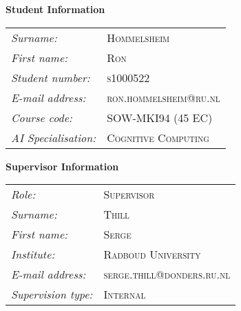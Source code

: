     
    \vspace{3cm}
    \textbf{Student Information} \\

    \begin{tabular}{L{3cm}l}
                \emph{Surname:} & \textsc{Hommelsheim} \\
                \emph{First name:} & \textsc{Ron} \\
                \emph{Student number:} & \textsc{s1000522} \\
                \emph{E-mail address:} & \textsc{ron.hommelsheim@ru.nl} \\
                \emph{Course code:} & \textsc{SOW-MKI94 (45 EC)} \\
                \emph{AI Specialisation:} & \textsc{Cognitive Computing} \\
        \end{tabular}
	
  \vspace{1cm}
  \textbf{Supervisor Information} \\

    \begin{tabular}{L{3cm}l}
            \emph{Role:} & \textsc{Supervisor} \\
            \emph{Surname:} & \textsc{Thill} \\
            \emph{First name:} & \textsc{Serge} \\
            \emph{Institute:} & \textsc{Radboud University} \\
            \emph{E-mail address:} & \textsc{serge.thill@donders.ru.nl} \\
            \emph{Supervision type:} & \textsc{Internal} \\
    \end{tabular}



\clearpage
\listoftodos[Notes]
\clearpage